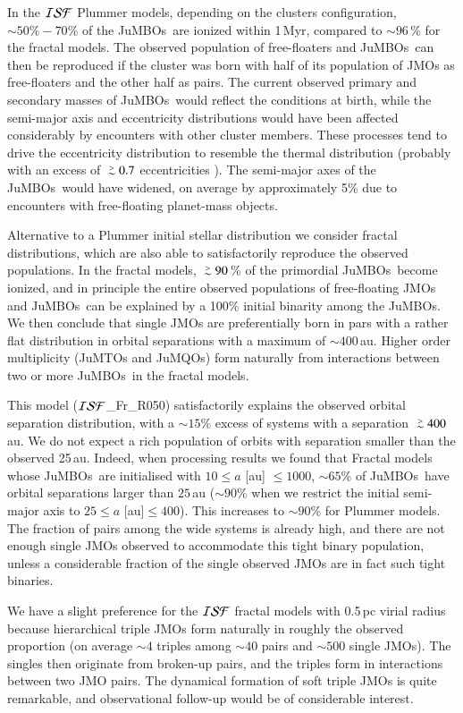\documentclass[submission,phys]{lib/SciPost}
\def\apgt{\ {\raise-.5ex\hbox{$\buildrel>\over\sim$}}\ }
\newcommand{\jumbos}{\mbox{JuMBOs}}
\begin{document}
In the ${\cal ISF}$ Plummer models, depending on the clusters
configuration, $\sim 50\%-70$\% of the \jumbos\, are ionized within
1\,Myr, compared to $\sim 96$\,\% for the fractal models.  The
observed population of free-floaters and \jumbos\, can then be
reproduced if the cluster was born with half of its population of JMOs
as free-floaters and the other half as pairs.  The current observed
primary and secondary masses of \jumbos\, would reflect the conditions
at birth, while the semi-major axis and eccentricity distributions
would have been affected considerably by encounters with other cluster
members. These processes tend to drive the eccentricity distribution
to resemble the thermal distribution (probably with an excess of
$\apgt 0.7$ eccentricities \cite{2000IJoMP...15..4871P}). The
semi-major axes of the \jumbos\ would have widened, on average by
approximately 5\% due to encounters with free-floating planet-mass
objects.

Alternative to a Plummer initial stellar distribution we consider
fractal distributions, which are also able to satisfactorily reproduce
the observed populations. In the fractal models, $\apgt 90$\,\% of the
primordial \jumbos\, become ionized, and in principle the entire
observed populations of free-floating JMOs and
\jumbos\, can be explained by a 100\% initial binarity among the
\jumbos. We then conclude that single JMOs are
preferentially born in pars with a rather flat distribution in orbital
separations with a maximum of $\sim 400$\,au.  Higher order
multiplicity (JuMTOs and JuMQOs) form naturally from interactions between
two or more \jumbos\, in the fractal models.

This model (${\cal ISF}$\_Fr\_R050) satisfactorily explains the
observed orbital separation distribution, with a $\sim 15$\% excess of
systems with a separation $\apgt 400$\,au. We do not expect a rich
population of orbits with separation smaller than the observed
25\,au. Indeed, when processing results we found that Fractal models
whose \jumbos\ are initialised with $10\leq a$ [au] $\leq 1000$,
$\sim65\%$ of \jumbos\ have orbital separations larger than $25$\,au
($\sim90\%$ when we restrict the initial semi-major axis to $25\leq a$
[au]$\leq 400$). This increases to $\sim 90\%$ for Plummer models.
The fraction of pairs among the wide systems is already high, and
there are not enough single JMOs observed to accommodate this tight
binary population, unless a considerable fraction of the single
observed JMOs are in fact such tight binaries.

We have a slight preference for the ${\cal ISF}$ fractal models with
0.5\,pc virial radius because hierarchical triple JMOs form naturally
in roughly the observed proportion (on average $\sim 4$ triples among
$\sim 40$ pairs and $\sim 500$ single JMOs). The singles then
originate from broken-up pairs, and the triples form in interactions
between two JMO pairs.  The dynamical formation of soft triple JMOs is
quite remarkable, and observational follow-up would be of considerable
interest.
\end{document}
